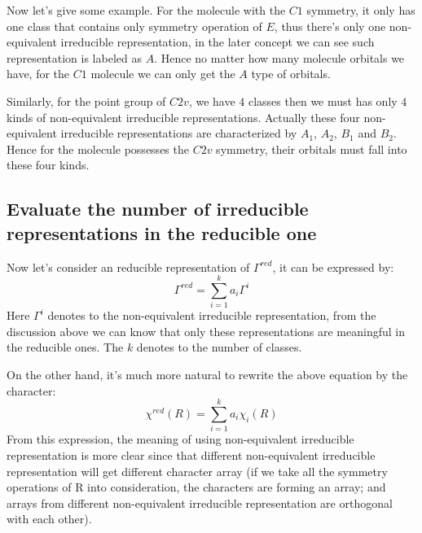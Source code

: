 Now let's give some example. For the molecule with the $C1$ symmetry,
it only has one class that contains only symmetry operation of $E$,
thus there's only one non-equivalent irreducible representation, in
the later concept we can see such representation is labeled as
$A$. Hence no matter how many molecule orbitals we have, for the $C1$
molecule we can only get the $A$ type of orbitals.

Similarly, for the point group of $C2v$, we have $4$ classes then we
must has only $4$ kinds of non-equivalent irreducible
representations. Actually these four non-equivalent irreducible
representations are characterized by $A_{1}$, $A_{2}$, $B_{1}$ and
$B_{2}$. Hence for the molecule possesses the $C2v$ symmetry, their
orbitals must fall into these four kinds.

\subsection{Evaluate the number of irreducible representations in the
  reducible one}
%
%
Now let's consider an reducible representation of $\Gamma^{red}$, it
can be expressed by:
\begin{equation}\label{}
  \Gamma^{red} = \sum_{i=1}^{k}a_{i}\Gamma^{i}
\end{equation}
Here $\Gamma^{i}$ denotes to the non-equivalent irreducible
representation, from the discussion above we can know that only these
representations are meaningful in the reducible ones. The $k$ denotes
to the number of classes.

On the other hand, it's much more natural to rewrite the above
equation by the character:
\begin{equation}\label{}
  \chi^{red}(R) = \sum_{i=1}^{k}a_{i}\chi_{i}(R)
\end{equation}
From this expression, the meaning of using non-equivalent irreducible
representation is more clear since that different non-equivalent
irreducible representation will get different character array (if we
take all the symmetry operations of R into consideration, the
characters are forming an array; and arrays from different
non-equivalent irreducible representation are orthogonal with each
other).

